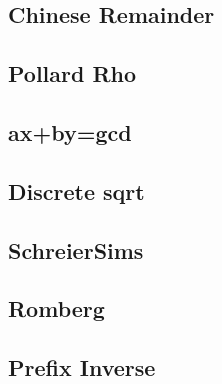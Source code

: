 \documentclass[a4paper,10pt,twocolumn,oneside]{article}
\begin{document}
\subsection{Chinese Remainder}


\subsection{Pollard Rho}


%

%

\subsection{ax+by=gcd}


\subsection{Discrete sqrt}


\subsection{SchreierSims}


\subsection{Romberg}


%

\subsection{Prefix Inverse}

\end{document}
